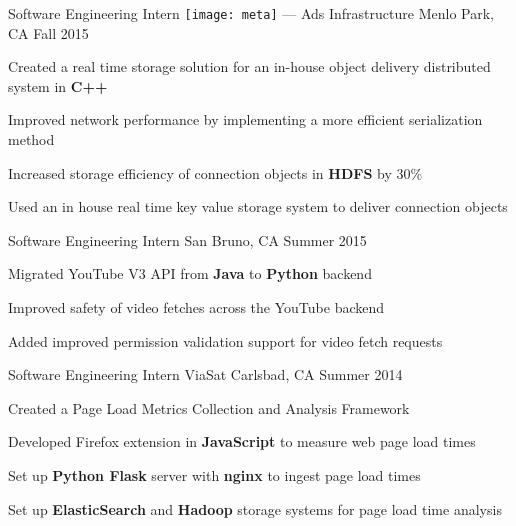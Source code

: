 \begin{cventries}

\cventry
{Software Engineering Intern} %
{{\texttt{[image: meta]}} --- Ads Infrastructure} %
{Menlo Park, CA} %
{Fall 2015} %
{ %
\begin{cvitems}
\item {Created a real time storage solution for an in-house object delivery distributed system in \textbf{C++}}
\item {Improved network performance by implementing a more efficient serialization method}
\item {Increased storage efficiency of connection objects in \textbf{HDFS} by 30\%}
\item {Used an in house real time key value storage system to deliver connection objects}
\end{cvitems}
}


\cventry
{Software Engineering Intern} %
{\google}%
{San Bruno, CA} %
{Summer 2015} %
{ %
\begin{cvitems}
\item {Migrated YouTube V3 API from \textbf{Java} to \textbf{Python} backend}
\item {Improved safety of video fetches across the YouTube backend}
\item {Added improved permission validation support for video fetch requests}
\end{cvitems} 
}


\cventry
{Software Engineering Intern} %
{ViaSat} %
{Carlsbad, CA} %
{Summer 2014} %
{ %
\begin{cvitems}
\item {Created a Page Load Metrics Collection and Analysis Framework}
\item {Developed Firefox extension in \textbf{JavaScript} to measure web page load times}
\item {Set up \textbf{Python Flask} server with \textbf{nginx} to ingest page load times}
\item {Set up \textbf{ElasticSearch} and \textbf{Hadoop} storage systems for page load time analysis}
\end{cvitems}
}


\end{cventries}
